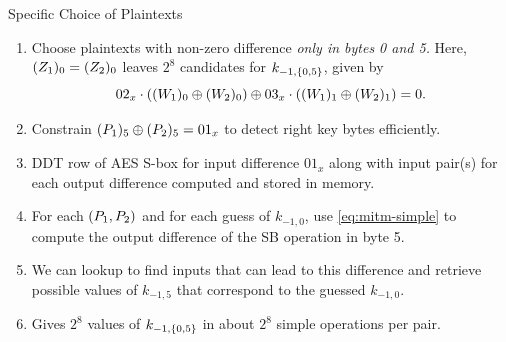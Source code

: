 \documentclass[notheorems]{beamer}
\theoremstyle{definition}
\theoremstyle{example}
\begin{document}
    \begin{frame}[<+->]{Specific Choice of Plaintexts}
        \begin{enumerate}
            \item Choose plaintexts with non-zero difference \emph{only in bytes
            0 and 5.} Here, \((Z_1)_0 = (Z_2)_0\) leaves \(2^8\)
            candidates for \(k_{-1, \{0, 5\}}\), given by
            \begin{equation}
                02_x \cdot ((W_1)_0 \oplus (W_2)_0) \oplus 03_x \cdot ((W_1)_1 \oplus (W_2)_1) = 0.
                \label{eq:mitm-simple}
            \end{equation}
            \item Constrain \((P_1)_5 \oplus (P_2)_5 = 01_x\) to
            detect right key bytes efficiently.
            \item DDT row of AES S-box for input difference \(01_x\) along with
            input pair(s) for each output difference computed and stored in
            memory.
            \item For each \((P_1, P_2)\) and for each guess of \(k_{-1,
            0}\), use \eqref{eq:mitm-simple} to compute the output difference of
            the SB operation in byte 5.
            \item We can lookup to find inputs that can lead to this difference
            and retrieve possible values of \(k_{-1, 5}\) that correspond to the
            guessed \(k_{-1, 0}\).
            \item Gives \(2^8\) values of \(k_{-1, \{0, 5\}}\) in about
            \(2^8\) simple operations per pair.
        \end{enumerate}        
    \end{frame}
\end{document}
